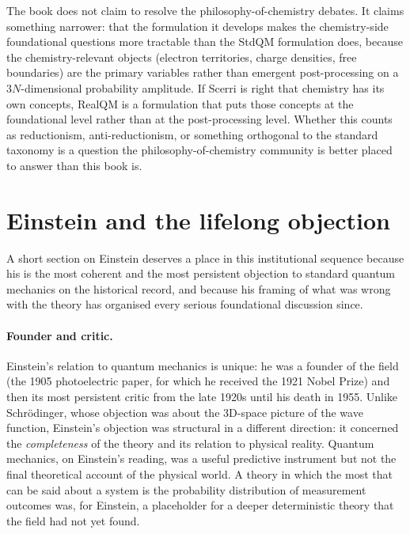 The book does not claim to resolve the philosophy-of-chemistry debates. It claims something narrower: that the formulation it develops makes the chemistry-side foundational questions more tractable than the StdQM formulation does, because the chemistry-relevant objects (electron territories, charge densities, free boundaries) are the primary variables rather than emergent post-processing on a $3N$-dimensional probability amplitude. If Scerri is right that chemistry has its own concepts, RealQM is a formulation that puts those concepts at the foundational level rather than at the post-processing level. Whether this counts as reductionism, anti-reductionism, or something orthogonal to the standard taxonomy is a question the philosophy-of-chemistry community is better placed to answer than this book is.

\section{Einstein and the lifelong objection}\label{sec:einstein-objection}

A short section on Einstein deserves a place in this institutional sequence because his is the most coherent and the most persistent objection to standard quantum mechanics on the historical record, and because his framing of what was wrong with the theory has organised every serious foundational discussion since.

\paragraph{Founder and critic.}
Einstein's relation to quantum mechanics is unique: he was a founder of the field (the 1905 photoelectric paper, for which he received the 1921 Nobel Prize) and then its most persistent critic from the late 1920s until his death in 1955. Unlike Schr\"odinger, whose objection was about the 3D-space picture of the wave function, Einstein's objection was structural in a different direction: it concerned the \emph{completeness} of the theory and its relation to physical reality. Quantum mechanics, on Einstein's reading, was a useful predictive instrument but not the final theoretical account of the physical world. A theory in which the most that can be said about a system is the probability distribution of measurement outcomes was, for Einstein, a placeholder for a deeper deterministic theory that the field had not yet found.

